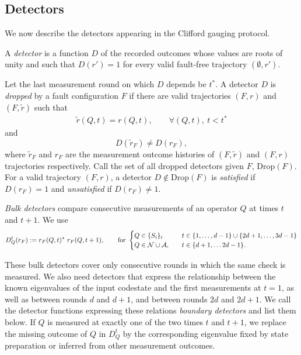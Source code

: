 \documentclass[11pt]{article}
\begin{document}
\subsection{Detectors}

We now describe the detectors appearing in the Clifford gauging protocol. 

\begin{definition}
   A \emph{detector} is a function $D$ of the recorded outcomes whose values are roots of unity and such that $D(r')=1$ for every valid fault-free trajectory $(\emptyset, r')$. 

    Let the last measurement round on which $D$ depends be $t^*$. 
    A detector $D$ is \emph{dropped} by a fault configuration $F$ if there are valid trajectories $(F,r)$ and $(F,\tilde{r})$ such that 
    \begin{align}
        \tilde{r}(Q,t)=r(Q,t),\qquad  \forall (Q,t),\ t<t^*
    \end{align}
    and 
    \[
    D(\tilde{r}_F)\neq D(r_F),
    \]
    where $\tilde{r}_F$ and $r_F$ are the measurement outcome histories of $(F,\tilde{r})$ and $(F,r)$ trajectories respectively.
    Call the set of all dropped detectors given $F$, $\mathrm{Drop}(F)$. For a valid trajectory $(F,r)$, a detector $D\notin \mathrm{Drop}(F)$ is \emph{satisfied} if $D(r_F)=1$ and \emph{unsatisfied} if $D(r_F)\neq 1$.
    \label{def:detectors}
\end{definition}

\emph{Bulk detectors} compare consecutive measurements of an operator $Q$ at times $t$ and $t+1$.
We use 
\[
D^t_Q(r_F) := r_F(Q,t)^*\ r_F(Q,t+1),\qquad \mathrm{for}\ \begin{cases}
    Q\in \{S_i\}_i\quad &t\in \{1,\dots,d-1\}\cup \{2d+1,\dots, 3d-1\}\\
    Q\in \cN\cup \cA,\quad &t\in \{d+1,\dots 2d-1\}.
\end{cases}
\]

These bulk detectors cover only consecutive rounds in which the same check is measured. 
We also need detectors that express the relationship between the known eigenvalues of the input codestate and the first measurements at $t=1$, as well as between rounds $d$ and $d+1$, and between rounds $2d$ and $2d+1$.
We call the detector functions expressing these relations \emph{boundary detectors} and list them below.
If $Q$ is measured at exactly one of the two times $t$ and $t+1$, we replace the missing outcome of $Q$ in $D^t_Q$ by the corresponding eigenvalue fixed by state preparation or inferred from other measurement outcomes.
\end{document}
